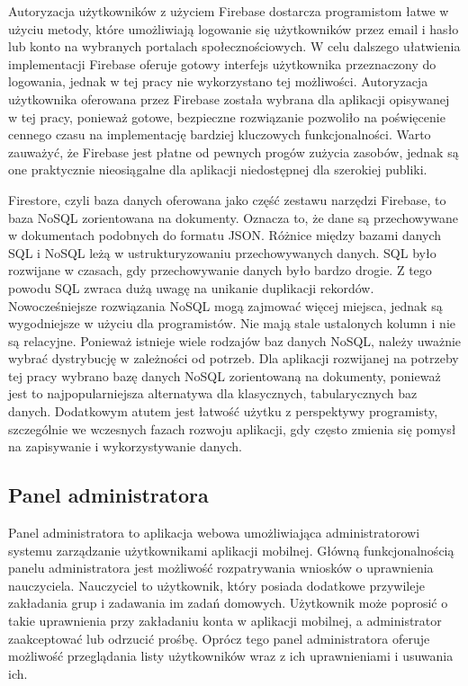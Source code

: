 \documentclass[a4paper,twoside,12pt]{book}
\begin{document}
Autoryzacja użytkowników z użyciem Firebase dostarcza programistom łatwe w użyciu metody, które umożliwiają logowanie się użytkowników przez email i hasło lub konto na wybranych portalach społecznościowych. W celu dalszego ułatwienia implementacji Firebase oferuje gotowy interfejs użytkownika przeznaczony do logowania, jednak w tej pracy nie wykorzystano tej możliwości. Autoryzacja użytkownika oferowana przez Firebase została wybrana dla aplikacji opisywanej w tej pracy, ponieważ gotowe, bezpieczne rozwiązanie pozwoliło na poświęcenie cennego czasu na implementację bardziej kluczowych funkcjonalności. Warto zauważyć, że Firebase jest płatne od pewnych progów zużycia zasobów, jednak są one praktycznie nieosiągalne dla aplikacji niedostępnej dla szerokiej publiki.

Firestore, czyli baza danych oferowana jako część zestawu narzędzi Firebase, to baza NoSQL zorientowana na dokumenty. Oznacza to, że dane są przechowywane w dokumentach podobnych do formatu JSON. Różnice między bazami danych SQL i NoSQL leżą w ustrukturyzowaniu przechowywanych danych. SQL było rozwijane w czasach, gdy przechowywanie danych było bardzo drogie. Z tego powodu SQL zwraca dużą uwagę na unikanie duplikacji rekordów. Nowocześniejsze rozwiązania NoSQL mogą zajmować więcej miejsca, jednak są wygodniejsze w użyciu dla programistów. Nie mają stale ustalonych kolumn i nie są relacyjne. Ponieważ istnieje wiele rodzajów baz danych NoSQL, należy uważnie wybrać dystrybucję w zależności od potrzeb. Dla aplikacji rozwijanej na potrzeby tej pracy wybrano bazę danych NoSQL zorientowaną na dokumenty, ponieważ jest to najpopularniejsza alternatywa dla klasycznych, tabularycznych baz danych. Dodatkowym atutem jest łatwość użytku z perspektywy programisty, szczególnie we wczesnych fazach rozwoju aplikacji, gdy często zmienia się pomysł na zapisywanie i wykorzystywanie danych. 

\subsection{Panel administratora}
Panel administratora to aplikacja webowa umożliwiająca administratorowi systemu zarządzanie użytkownikami aplikacji mobilnej. Główną funkcjonalnością panelu administratora jest możliwość rozpatrywania wniosków o uprawnienia nauczyciela. Nauczyciel to użytkownik, który posiada dodatkowe przywileje zakładania grup i zadawania im zadań domowych. Użytkownik może poprosić o takie uprawnienia przy zakładaniu konta w aplikacji mobilnej, a administrator zaakceptować lub odrzucić prośbę. Oprócz tego panel administratora oferuje możliwość przeglądania listy użytkowników wraz z ich uprawnieniami i usuwania ich.
\end{document}
